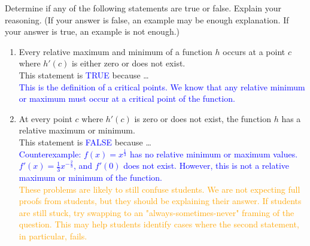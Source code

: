 \documentclass{ximera}
\begin{document}
\begin{exercise}
    Determine if any of the following statements are true or false.  Explain your reasoning. (If your answer is false, an example may be enough explanation.  If your answer is true, an example is not enough.)
    \begin{enumerate}
        \item Every relative maximum and minimum of a function $h$ occurs at a point $c$ where $h'(c)$ is either zero or does not exist.\\
        This statement is \textcolor{blue}{TRUE}  because \dots\\
        \textcolor{blue}{This is the definition of a critical points.  We know that any relative minimum or maximum must occur at a critical point of the function. }
        \item At every point $c$ where $h'(c)$ is zero or does not exist, the function $h$ has a relative maximum or minimum.\\
        This statement is \textcolor{blue}{FALSE} because \dots\\
        \textcolor{blue}{Counterexample: $f(x)=x^{\frac{1}{3}}$ has no relative minimum or maximum values.\\
        $f'(x)=\frac{1}{3}x^{-\frac23}$, and $f'(0)$ does not exist.  However, this is not a relative maximum or minimum of the function.}\\
        \textcolor{orange}{These problems are likely to still confuse students.  We are not expecting full proofs from students, but they should be explaining their answer.  If students are still stuck, try swapping to an "always-sometimes-never" framing of the question.  This may help students identify cases where the second statement, in particular, fails.}
    \end{enumerate}
\end{exercise}
\end{document}
